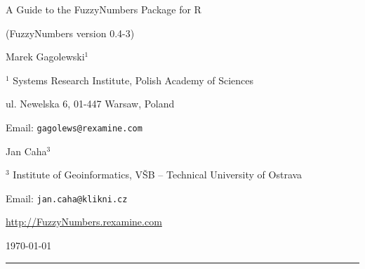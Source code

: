 \documentclass[11pt]{article}\usepackage[]{graphicx}\usepackage[]{color}
\newcommand{\package}[1]{\textsf{#1}\xspace}
\newcommand{\lang}[1]{\textsf{#1}\xspace}
\newcommand{\R}{\lang{R}}
\begin{document}



\begin{center}
{\LARGE\sf A Guide to the \package{FuzzyNumbers} Package for \R}

{\Large\sf (FuzzyNumbers version {0.4-3}) }

\bigskip
{\large Marek Gagolewski${}^{1}$}

${}^{1}$ Systems Research Institute, Polish Academy of Sciences

ul. Newelska 6, 01-447 Warsaw, Poland

Email: \texttt{gagolews@rexamine.com}

{\large Jan Caha${}^{3}$}

${}^{3}$ Institute of Geoinformatics, VŠB -- Technical University of Ostrava

Email: \texttt{jan.caha@klikni.cz}

\bigskip

\href{http://FuzzyNumbers.rexamine.com/}%
{http://FuzzyNumbers.rexamine.com}

\bigskip
\today



\end{center}





\bigskip\hrule\bigskip
\tableofcontents




\end{document}
